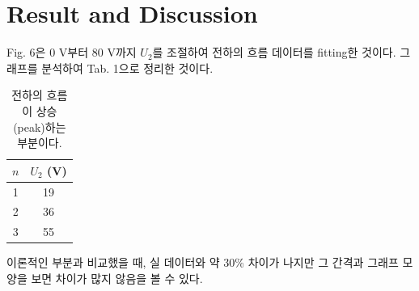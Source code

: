 \documentclass[a4paper, 10pt, nanum]{CSUniSchoolLabReport}
\begin{document}


\section{Result and Discussion}


	Fig. 6은 0 V부터 80 V까지 $U_2$를 조절하여 전하의 흐름 데이터를 fitting한 것이다. 그래프를 분석하여 Tab. 1으로 정리한 것이다.

	\begin{table}[htb!]
		\label{tab:1}
		\centering
		\caption{전하의 흐름이 상승(peak)하는 부분이다.}
		\begin{tabular}{c|c}
				\noalign{\smallskip}\noalign{\smallskip}\hline\hline
				$n$ & $U_2$ (V) \\
			\hline
				1 & 19 \\
				2 & 36 \\
				3 & 55 \\
			\hline
			\hline
		\end{tabular}
	\end{table}

	이론적인 부분과 비교했을 때, 실 데이터와 약 30\% 차이가 나지만 그 간격과 그래프 모양을 보면 차이가 많지 않음을 볼 수 있다.

\end{document}
